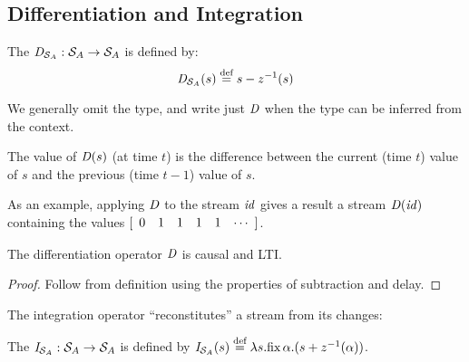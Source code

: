 \subsection{Differentiation and Integration}

\begin{definition}[Differentiation]
The  $\mathit{D}_{\mathcal{S}_{A}} : \mathcal{S}_{A} \to \mathcal{S}_{A}$ is defined by:
$$
\mathit{D}_{\mathcal{S}_{A}}(s) \stackrel{\textrm{\scriptsize def}}{=} s - z^{-1}(s)
$$
\end{definition}
We generally omit the type, and write just $\mathit{D}$ when the type can be inferred from the context.

The value of $\mathit{D}(s)$ (at time $t$) is the difference
between  the current (time $t$) value of $s$ and the previous (time $t-1$) value of $s$.

As an example, applying $\mathit{D}$ to the stream $\mathit{id}$ gives a result a
stream $\mathit{D}(\mathit{id})$ containing the values $\sv{0 1 1 1 1}$.

\begin{center}
\end{center}

\begin{proposition}
\label{prop-diff-properties}
The differentiation operator $\mathit{D}$ is causal and LTI.
\end{proposition}
\begin{proof}
Follow from definition using the properties of subtraction and delay.
\end{proof}

The integration operator ``reconstitutes'' a stream from its changes:

\begin{definition}[Integration]
The   $\mathit{I}_{\mathcal{S}_{A}} : \mathcal{S}_{A} \to \mathcal{S}_{A}$
is defined by $\mathit{I}_{\mathcal{S}_{A}}(s) \stackrel{\textrm{\scriptsize def}}{=} \lambda s . \mbox{fix}\,\alpha.(s + z^{-1}(\alpha))$.
\end{definition}

